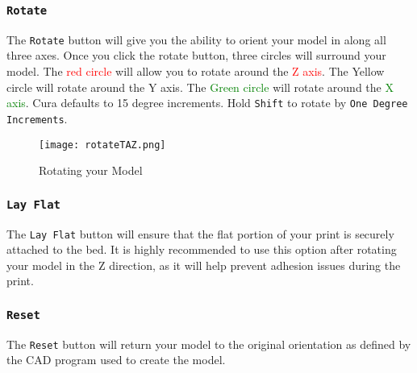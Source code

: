 \subsubsection{\texttt{Rotate}}
The \texttt{Rotate} button will give you the ability to orient your model in along all three axes. Once you click the rotate button, three circles will surround your model. The \textcolor{red}{red circle} will allow you to rotate around the \textcolor{red}{Z axis}. The \textcolor{yellow1}{Yellow circle} will rotate around the \textcolor{yellow1}{Y axis}. The \textcolor{green}{Green circle} will rotate around the \textcolor{green}{X axis}. Cura defaults to 15 degree increments. Hold \texttt{Shift} to rotate by \texttt{One Degree Increments}.
\begin{figure}[H]
\centering
\texttt{[image: rotateTAZ.png]}
\caption{Rotating your Model}
\label{fig:Rotating your Model}
\end{figure}

\subsubsection{\texttt{Lay Flat}}
The \texttt{Lay Flat} button will ensure that the flat portion of your print is securely attached to the bed. It is highly recommended to use this option after rotating your model in the Z direction, as it will help prevent adhesion issues during the print.

\subsubsection{\texttt{Reset}}
The \texttt{Reset} button will return your model to the original orientation as defined by the CAD program used to create the model.

